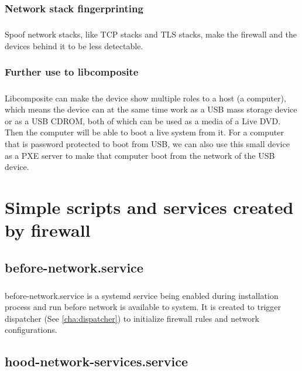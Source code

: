 \documentclass[mscthesis]{usiinfthesis}
\begin{document}
\subsection{Network stack fingerprinting}
\paragraph{}
Spoof network stacks, like TCP stacks and TLS stacks, make the firewall and the devices behind it to be less detectable.

\subsection{Further use to libcomposite}
\paragraph{}
Libcomposite can make the device show multiple roles to a host (a computer), which means the device can at the same time work as a USB mass storage device or as a USB CDROM, both of which can be used as a media of a Live DVD. Then the computer will be able to boot a live system from it. For a computer that is password protected to boot from USB, we can also use this small device as a PXE server to make that computer boot from the network of the USB device.

\appendix

\chapter{Simple scripts and services created by firewall}

\section{before-network.service}\label{sec:before-network-service}
\paragraph{}
before-network.service is a systemd service being enabled during installation process and run before network is available to system. It is created to trigger dispatcher (See \cref{cha:dispatcher}) to initialize firewall rules and network configurations.

\section{hood-network-services.service}\label{sec:hood-network-services.service}
\end{document}
